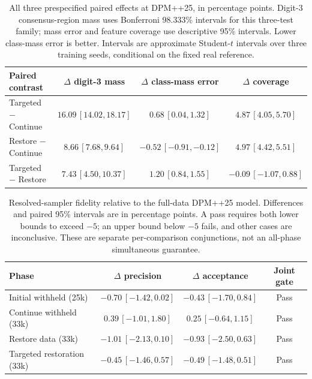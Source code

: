 \begin{table}[t]
\centering\footnotesize
\setlength{\tabcolsep}{3.5pt}
\caption{All three prespecified paired effects at DPM++25, in percentage points. Digit-3 consensus-region mass uses Bonferroni 98.333\% intervals for this three-test family; mass error and feature coverage use descriptive 95\% intervals. Lower class-mass error is better. Intervals are approximate Student-$t$ intervals over three training seeds, conditional on the fixed real reference.}
\label{tab:mnist_primary_contrasts}
\begin{tabular}{lccc}
\toprule
Paired contrast & $\Delta$ digit-3 mass & $\Delta$ class-mass error & $\Delta$ coverage \\
\midrule
Targeted $-$ Continue & $16.09\,[14.02,18.17]$ & $0.68\,[0.04,1.32]$ & $4.87\,[4.05,5.70]$ \\
Restore $-$ Continue & $8.66\,[7.68,9.64]$ & $-0.52\,[-0.91,-0.12]$ & $4.97\,[4.42,5.51]$ \\
Targeted $-$ Restore & $7.43\,[4.50,10.37]$ & $1.20\,[0.84,1.55]$ & $-0.09\,[-1.07,0.88]$ \\
\bottomrule
\end{tabular}
\end{table}

\begin{table}[t]
\centering\footnotesize
\setlength{\tabcolsep}{3.5pt}
\caption{Resolved-sampler fidelity relative to the full-data DPM++25 model. Differences and paired 95\% intervals are in percentage points. A pass requires both lower bounds to exceed $-5$; an upper bound below $-5$ fails, and other cases are inconclusive. These are separate per-comparison conjunctions, not an all-phase simultaneous guarantee.}
\label{tab:mnist_quality}
\begin{tabular}{lccc}
\toprule
Phase & $\Delta$ precision & $\Delta$ acceptance & Joint gate \\
\midrule
Initial withheld (25k) & $-0.70\,[-1.42,0.02]$ & $-0.43\,[-1.70,0.84]$ & Pass \\
Continue withheld (33k) & $0.39\,[-1.01,1.80]$ & $0.25\,[-0.64,1.15]$ & Pass \\
Restore data (33k) & $-1.01\,[-2.13,0.10]$ & $-0.93\,[-2.50,0.63]$ & Pass \\
Targeted restoration (33k) & $-0.45\,[-1.46,0.57]$ & $-0.49\,[-1.48,0.51]$ & Pass \\
\bottomrule
\end{tabular}
\end{table}

